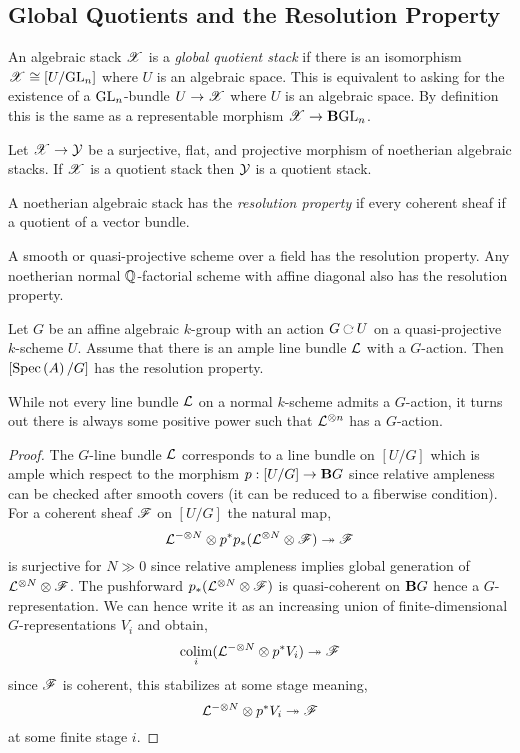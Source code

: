 \documentclass[12pt]{article}
\begin{document}
\subsection{Global Quotients and the Resolution Property}

\begin{defn}
An algebraic stack $\mathscr{X}$ is a \textit{global quotient stack} if there is an isomorphism $\mathscr{X} \cong [U / \mathrm{GL}_n]$ where $U$ is an algebraic space. This is equivalent to asking for the existence of a $\mathrm{GL}_n$-bundle $U \to \mathscr{X}$ where $U$ is an algebraic space. By definition this is the same as a representable morphism $\mathscr{X} \to \mathbf{B} \mathrm{GL}_n$.
\end{defn}

\begin{prop}
Let $\mathscr{X} \to \mathcal{Y}$ be a surjective, flat, and projective morphism of noetherian algebraic stacks. If $\mathscr{X}$ is a quotient stack then $\mathcal{Y}$ is a quotient stack.
\end{prop}

\begin{defn}
A noetherian algebraic stack has the \textit{resolution property} if every coherent sheaf if a quotient of a vector bundle.
\end{defn}

A smooth or quasi-projective scheme over a field has the resolution property. Any noetherian normal $\mathbb{Q}$-factorial scheme with affine diagonal also has the resolution property.

\begin{prop}
Let $G$ be an affine algebraic $k$-group with an action $G \acts U$ on a quasi-projective $k$-scheme $U$. Assume that there is an ample line bundle $\mathcal{L}$ with a $G$-action. Then $[\mathrm{Spec}\left( A \right)/G]$ has the resolution property.
\end{prop}

\begin{rmk}
While not every line bundle $\mathcal{L}$ on a normal $k$-scheme admits a $G$-action, it turns out there is always some positive power such that $\mathcal{L}^{\otimes n}$ has a $G$-action.
\end{rmk}

\begin{proof}
The $G$-line bundle $\mathcal{L}$ corresponds to a line bundle on $[U/G]$ which is ample which respect to the morphism $p : [U/G] \to \mathbf{B} G$ since relative ampleness can be checked after smooth covers (it can be reduced to a fiberwise condition). For a coherent sheaf $\mathscr{F}$ on $[U/G]$ the natural map,
\[ \mathcal{L}^{-\otimes N} \otimes p^* p_* (\mathcal{L}^{\otimes N} \otimes \mathscr{F}) \twoheadrightarrow \mathscr{F} \]
is surjective for $N \gg 0$ since relative ampleness implies global generation of $\mathcal{L}^{\otimes N} \otimes \mathscr{F}$. The pushforward $p_* (\mathcal{L}^{\otimes N} \otimes \mathscr{F})$ is quasi-coherent on $\mathbf{B} G$ hence a $G$-representation. We can hence write it as an increasing union of finite-dimensional $G$-representations $V_i$ and obtain,
\[ \operatorname*{\mathrm{colim}}_i (\mathcal{L}^{-\otimes N} \otimes p^* V_i) \twoheadrightarrow \mathscr{F} \]
since $\mathscr{F}$ is coherent, this stabilizes at some stage meaning,
\[ \mathcal{L}^{-\otimes N} \otimes p^* V_i \twoheadrightarrow \mathscr{F} \]
at some finite stage $i$.
\end{proof}
\end{document}
